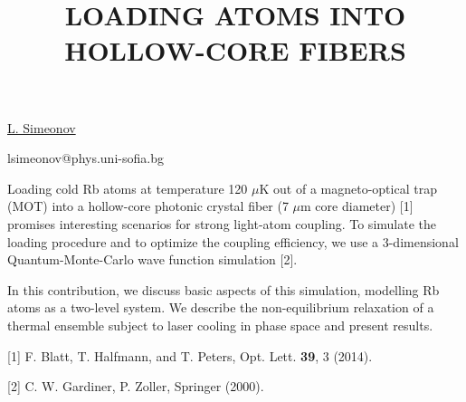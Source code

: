 \title{LOADING ATOMS INTO HOLLOW-CORE FIBERS}

\underline{L. Simeonov} 

{\normalsize{\vspace{-4mm}
\darmstadt

\email lsimeonov@phys.uni-sofia.bg}}

Loading cold Rb atoms at temperature 120 $\mu$K out of a magneto-optical trap (MOT) into a hollow-core photonic crystal fiber (7 $\mu$m core diameter) [1] promises interesting scenarios for strong light-atom coupling. To simulate the loading procedure and to optimize the coupling efficiency, we use a 3-dimensional Quantum-Monte-Carlo wave function simulation [2].

In this contribution, we discuss basic aspects of this simulation, modelling Rb atoms as a two-level system. We describe the non-equilibrium relaxation of a thermal ensemble subject to laser cooling in phase space and present results.

{\normalsize
[1] F. Blatt, T. Halfmann, and T. Peters, Opt. Lett. \textbf{39}, 3 (2014).
\vsp

[2] C. W. Gardiner, P. Zoller, Springer (2000).
}

\vspace{\baselineskip}
